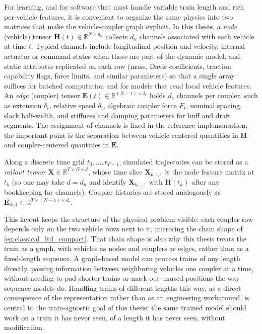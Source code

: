 For learning, and for software that must handle variable train length and rich per-vehicle features, it is convenient to organize the same physics into two matrices that make the vehicle-coupler graph explicit.
In this thesis, a \emph{node} (vehicle) tensor $\mathbf{H}(t) \in \mathbb{R}^{N \times d_n}$ collects $d_n$ channels associated with each vehicle at time $t$.
Typical channels include longitudinal position and velocity, internal actuator or command states when those are part of the dynamic model, and static attributes replicated on each row (mass, Davis coefficients, traction capability flags, force limits, and similar parameters) so that a single array suffices for batched computation and for models that read local vehicle features.
An \emph{edge} (coupler) tensor $\mathbf{E}(t) \in \mathbb{R}^{(N-1) \times d_e}$ holds $d_e$ channels per coupler, such as extension $\delta_i$, relative speed $\dot{\delta}_i$, algebraic coupler force $F_i$, nominal spacing, slack half-width, and stiffness and damping parameters for buff and draft segments.
The assignment of channels is fixed in the reference implementation; the important point is the separation between vehicle-centered quantities in $\mathbf{H}$ and coupler-centered quantities in $\mathbf{E}$.

Along a discrete time grid $t_0,\ldots,t_{T-1}$, simulated trajectories can be stored as a \emph{rollout tensor} $\mathbf{X} \in \mathbb{R}^{T \times N \times d}$, whose time slice $\mathbf{X}_{k,:,:}$ is the node feature matrix at $t_k$ (so one may take $d=d_n$ and identify $\mathbf{X}_{k,:,:}$ with $\mathbf{H}(t_k)$ after any bookkeeping for channels).
Coupler histories are stored analogously as $\mathbf{E}_{\mathrm{hist}} \in \mathbb{R}^{T \times (N-1) \times d_e}$.

This layout keeps the structure of the physical problem visible: each coupler row depends only on the two vehicle rows next to it, mirroring the chain shape of \cref{eq:classical_ltd_compact}.
That chain shape is also why this thesis treats the train as a graph, with vehicles as nodes and couplers as edges, rather than as a fixed-length sequence.
A graph-based model can process trains of any length directly, passing information between neighboring vehicles one coupler at a time, without needing to pad shorter trains or mask out unused positions the way sequence models do.
Handling trains of different lengths this way, as a direct consequence of the representation rather than as an engineering workaround, is central to the train-agnostic goal of this thesis: the same trained model should work on a train it has never seen, of a length it has never seen, without modification.

